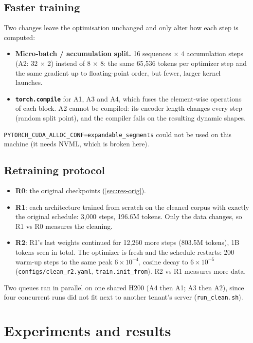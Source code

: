 \documentclass[11pt,a4paper]{article}
\newcommand{\code}[1]{\texttt{\small #1}}
\begin{document}
\subsection{Faster training}\label{sec:throughput}
Two changes leave the optimisation unchanged and only alter how each step is computed:
\begin{itemize}
  \item \textbf{Micro-batch / accumulation split.} 16 sequences $\times$ 4 accumulation steps (A2: 32 $\times$
  2) instead of 8 $\times$ 8: the same 65{,}536 tokens per optimizer step and the same gradient up to
  floating-point order, but fewer, larger kernel launches.
  \item \textbf{\code{torch.compile}} for A1, A3 and A4, which fuses the element-wise operations of each
  block.  A2 cannot be compiled: its encoder length changes every step (random split point), and the
  compiler fails on the resulting dynamic shapes.
\end{itemize}
\code{PYTORCH\_CUDA\_ALLOC\_CONF=expandable\_segments} could not be used on this machine (it needs NVML, which
is broken here).

\subsection{Retraining protocol}\label{sec:retrain}
\begin{itemize}
  \item \textbf{R0}: the original checkpoints (\autoref{sec:res-orig}).
  \item \textbf{R1}: each architecture trained from scratch on the cleaned corpus with exactly the original
  schedule: 3{,}000 steps, 196.6M tokens.  Only the data changes, so R1 vs R0 measures the cleaning.
  \item \textbf{R2}: R1's last weights continued for 12{,}260 more steps (803.5M tokens), 1B tokens seen in
  total.  The optimizer is fresh and the schedule restarts: 200 warm-up steps to the same peak
  $6\times10^{-4}$, cosine decay to $6\times10^{-5}$ (\code{configs/clean\_r2.yaml},
  \code{train.init\_from}).  R2 vs R1 measures more data.
\end{itemize}
Two queues ran in parallel on one shared H200 (A4 then A1; A3 then A2), since four concurrent runs did not
fit next to another tenant's server (\code{run\_clean.sh}).

\section{Experiments and results}
\end{document}
